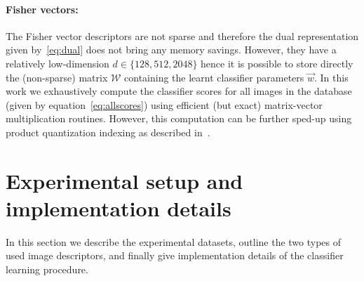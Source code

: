 \paragraph{Fisher vectors:}
% 
%   
The Fisher vector descriptors are not sparse and therefore the dual representation given by~\eqref{eq:dual} does not bring any memory savings.
However, they have a relatively low-dimension $d\in\{128, 512, 2048\}$ hence
it is possible to store directly the (non-sparse) matrix $\mathcal{W}$ containing the learnt
classifier parameters $\vec{w}$.
In this work we exhaustively compute the classifier scores for all images in the database (given by equation~\eqref{eq:allscores}) using efficient (but exact) matrix-vector multiplication routines.
However, this computation can be further sped-up using product quantization indexing as described in~\cite{Jegou12}.     



\section{Experimental setup and implementation details}
\label{sec:experiments}
   In this section we describe the experimental datasets, outline the two types of used image descriptors, and finally give implementation details of the classifier learning procedure.
